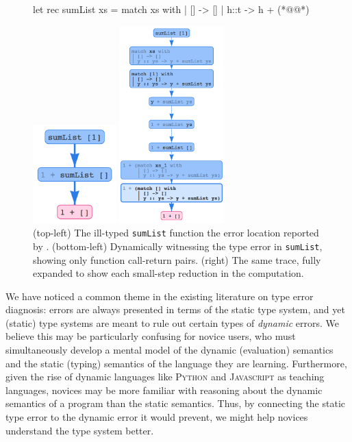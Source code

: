 \begin{figure}[t]
\centering
\begin{minipage}{.49\linewidth}
\centering
\begin{ecode}
let rec sumList xs =
  match xs with
  | []   -> []
  | h::t -> h + (*@@*)
\end{ecode}
\vspace{2em}
\includegraphics[height=1.5in]{nanomaly/sumList-overview.png}
\end{minipage}
\begin{minipage}{.49\linewidth}
\centering
\includegraphics[height=3in]{nanomaly/sumList-long.png}
\end{minipage}
\vspace{1em}
\caption{(top-left) The ill-typed \texttt{sumList} function
   the error location reported by
  \ocaml. (bottom-left) Dynamically witnessing the type error in
  \texttt{sumList}, showing only function call-return pairs. (right) The
  same trace, fully expanded to show each small-step reduction in the
  computation.}
\label{fig:factorial}
\end{figure}

We have noticed a common theme in the existing literature on type error
diagnosis: errors are always presented in terms of the static type
system, and yet (static) type systems are meant to rule out certain
types of \emph{dynamic} errors.
%
We believe this may be particularly confusing for novice users, who must
simultaneously develop a mental model of the dynamic (evaluation)
semantics and the static (typing) semantics of the language they are
learning.
%
Furthermore, given the rise of dynamic languages like \textsc{Python}
and \textsc{Javascript} as teaching languages, novices may be more
familiar with reasoning about the dynamic semantics of a program than
the static semantics.
%
Thus, by connecting the static type error to the dynamic error it
would prevent, we might help novices understand the type system better.

